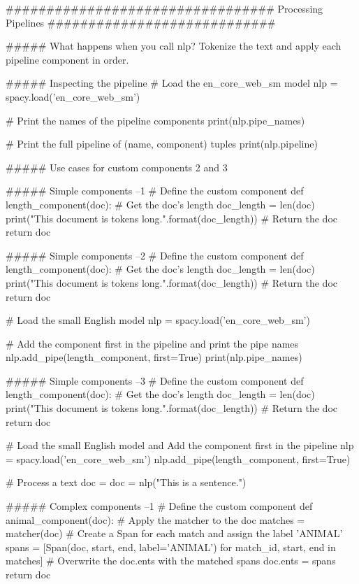 #################################   Processing Pipelines    ############################


##### What happens when you call nlp?
Tokenize the text and apply each pipeline component in order.

##### Inspecting the pipeline
# Load the en_core_web_sm model
nlp = spacy.load('en_core_web_sm')

# Print the names of the pipeline components
print(nlp.pipe_names)

# Print the full pipeline of (name, component) tuples
print(nlp.pipeline)


##### Use cases for custom components
2 and 3


##### Simple components  --1
# Define the custom component
def length_component(doc):
    # Get the doc's length
    doc_length = len(doc)
    print("This document is {} tokens long.".format(doc_length))
    # Return the doc
    return doc



##### Simple components --2
# Define the custom component
def length_component(doc):
    # Get the doc's length
    doc_length = len(doc)
    print("This document is {} tokens long.".format(doc_length))
    # Return the doc
    return doc

# Load the small English model
nlp = spacy.load('en_core_web_sm')
  
# Add the component first in the pipeline and print the pipe names
nlp.add_pipe(length_component, first=True)
print(nlp.pipe_names)



##### Simple components --3
# Define the custom component
def length_component(doc):
    # Get the doc's length
    doc_length = len(doc)
    print("This document is {} tokens long.".format(doc_length))
    # Return the doc
    return doc
  
# Load the small English model and Add the component first in the pipeline
nlp = spacy.load('en_core_web_sm')
nlp.add_pipe(length_component, first=True)

# Process a text
doc = doc = nlp("This is a sentence.")


##### Complex components --1
# Define the custom component
def animal_component(doc):
    # Apply the matcher to the doc
    matches = matcher(doc)
    # Create a Span for each match and assign the label 'ANIMAL'
    spans = [Span(doc, start, end, label='ANIMAL')
             for match_id, start, end in matches]
    # Overwrite the doc.ents with the matched spans
    doc.ents = spans
    return doc



